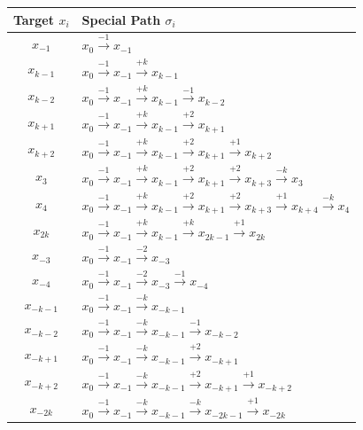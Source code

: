  
 
\begin{center}
  \begin{tabular}{|c|l|}
 \hline
 Target $x_i$ & Special Path $\sigma_i$\\
 \hline
  $x_{-1}$ &  $x_{0}\xrightarrow {-1} x_{-1}$\\
  $x_{k-1}$ &  $x_{0}\xrightarrow {-1}x_{-1}\xrightarrow {+k}x_{k-1}$\\
  $x_{k-2}$ &  $x_{0} \xrightarrow {-1}x_{-1}\xrightarrow {+k}x_{k-1}\xrightarrow {-1}x_{k-2}$\\
  $x_{k+1}$ &  $x_{0} \xrightarrow {-1}x_{-1}\xrightarrow {+k}x_{k-1}\xrightarrow {+2}x_{k+1}$\\
  $x_{k+2}$ &  $x_{0} \xrightarrow {-1}x_{-1}\xrightarrow {+k}x_{k-1}\xrightarrow {+2}x_{k+1}\xrightarrow {+1}x_{k+2}$\\
  $x_{3}$ &  $x_{0} \xrightarrow {-1}x_{-1}\xrightarrow {+k}x_{k-1}\xrightarrow {+2}x_{k+1}\xrightarrow {+2}x_{k+3}\xrightarrow {-k}x_{3}$\\
  $x_{4}$ &  $x_{0} \xrightarrow {-1}x_{-1}\xrightarrow {+k}x_{k-1}\xrightarrow {+2}x_{k+1}\xrightarrow {+2}x_{k+3}\xrightarrow {+1}x_{k+4} \xrightarrow {-k}x_{4}$\\

$x_{2k}$ &   $ x_{0} \xrightarrow {-1} x_{-1} \xrightarrow {+k} x_{k-1} \xrightarrow {+k} x_{2k-1} \xrightarrow {+1}  x_{2k}$\\
  $x_{-3}$ &  $x_{0}\xrightarrow {-1}x_{-1}\xrightarrow {-2}x_{-3}$\\
  $x_{-4}$ &  $x_{0}\xrightarrow {-1}x_{-1}\xrightarrow {-2}x_{-3} \xrightarrow {-1}x_{-4}$\\
 $x_{-k-1}$ & $ x_{0} \xrightarrow {-1} x_{-1} \xrightarrow {-k} x_{-k-1}$\\
 $x_{-k-2}$ & $ x_{0} \xrightarrow {-1} x_{-1} \xrightarrow {-k} x_{-k-1} \xrightarrow {-1} x_{-k-2}$\\
 $x_{-k+1}$ & $ x_{0} \xrightarrow {-1} x_{-1} \xrightarrow {-k} x_{-k-1} \xrightarrow {+2} x_{-k+1}$\\
 $x_{-k+2}$ & $ x_{0} \xrightarrow {-1} x_{-1} \xrightarrow {-k} x_{-k-1} \xrightarrow {+2} x_{-k+1}\xrightarrow {+1} x_{-k+2}$\\

 $x_{-2k}$  & $x_{0} \xrightarrow {-1} x_{-1} \xrightarrow {-k} x_{-k-1} \xrightarrow {-k} x_{-2k-1} \xrightarrow {+1} x_{-2k}$\\
 \hline
 \end{tabular}
 \end{center}
 

